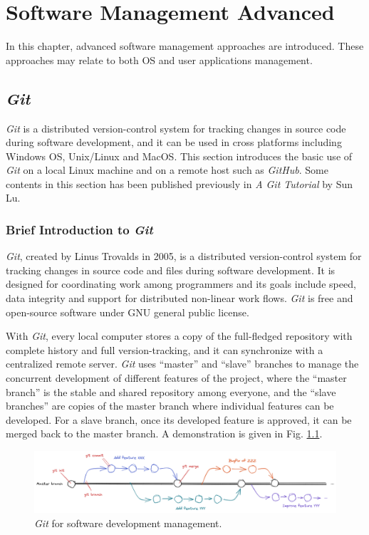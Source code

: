 \chapter{Software Management Advanced}

In this chapter, advanced software management approaches are introduced. These approaches may relate to both OS and user applications management.

\section{\textit{Git}}

\textit{Git} is a distributed version-control system for tracking changes in source code during software development, and it can be used in cross platforms including Windows OS, Unix/Linux and MacOS. This section introduces the basic use of \textit{Git} on a local Linux machine and on a remote host such as \textit{GitHub}. Some contents in this section has been published previously in \textit{A Git Tutorial} by Sun Lu.

\subsection{Brief Introduction to \textit{Git}}

\textit{Git}, created by Linus Trovalds in 2005, is a distributed version-control system for tracking changes in source code and files during software development. It is designed for coordinating work among programmers and its goals include speed, data integrity and support for distributed non-linear work flows. \textit{Git} is free and open-source software under GNU general public license.

With \textit{Git}, every local computer stores a copy of the full-fledged repository with complete history and full version-tracking, and it can synchronize with a centralized remote server. \textit{Git} uses ``master'' and ``slave'' branches to manage the concurrent development of different features of the project, where the ``master branch'' is the stable and shared repository among everyone, and the ``slave branches'' are copies of the master branch where individual features can be developed. For a slave branch, once its developed feature is approved, it can be merged back to the master branch. A demonstration is given in Fig. \ref{ch:sma:fig:gitflow}.
\begin{figure}
	\centering
	\includegraphics[width=350pt]{chapters/ch-software-management-advanced/figures/gitflow.png}
	\caption{\textit{Git} for software development management.} \label{ch:sma:fig:gitflow}
\end{figure}

